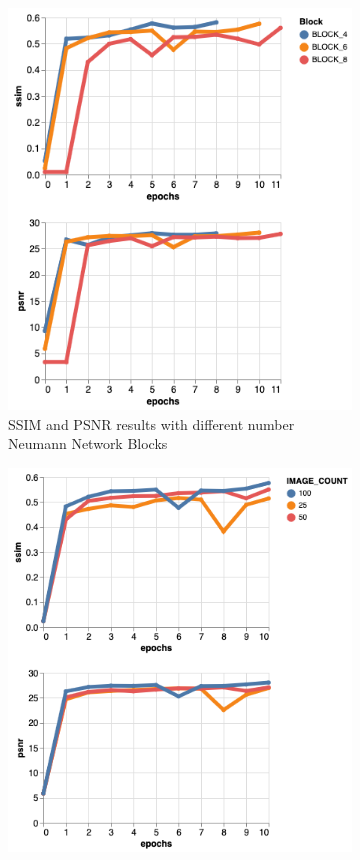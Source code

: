 \documentclass{article}
\begin{document}
\begin{figure}[H] 
\centering
   \begin{subfigure}[b]{.5\textwidth}
   \centering
   		\includegraphics[width=\textwidth]{block_metrics}
		\caption{SSIM and PSNR results with different number Neumann Network Blocks}
    \end{subfigure}%
   \begin{subfigure}[b]{.5\textwidth}
   \centering   
      		\includegraphics[width=\textwidth]{ssim_psnr_image_count}

\end{subfigure}
\end{figure}
\end{document}
